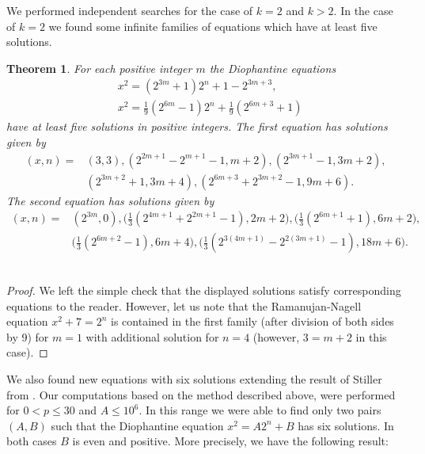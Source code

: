 \documentclass[10pt]{amsart}
\theoremstyle{plain}
\newtheorem{thm}{Theorem}[section]
\begin{document}
We performed independent searches for the case of $k=2$ and $k>2$.  In the case of $k=2$ we found some infinite families of equations which have at least five solutions.

\begin{thm}
For each positive integer $m$ the Diophantine equations
\begin{align*}
  &x^2=(2^{3m}+1)2^{n}+1-2^{3m+3}, \\
  &x^2=\frac{1}{9}(2^{6m}-1)2^{n}+\frac{1}{9}(2^{6m+3}+1)
\end{align*}
have at least five solutions in positive integers. The first equation has solutions given by
\begin{align*}
(x,n)=&(3,3), (2^{2m+1}-2^{m+1}-1,m+2), (2^{3m+1}-1, 3m+2), \\
      &(2^{3m+2}+1,3m+4), (2^{6m+3}+2^{3m+2}-1, 9m+6).
\end{align*}
The second equation has solutions given by
\begin{align*}
(x,n)=&(2^{3m},0), \Big(\frac{1}{3}(2^{4m+1}+2^{2m+1}-1), 2m+2\Big), \Big(\frac{1}{3}(2^{6m+1}+1), 6m+2\Big),\\
      &\Big(\frac{1}{3}(2^{6m+2}-1), 6m+4\Big), \Big(\frac{1}{3}(2^{3(4m+1)}-2^{2(3m+1)}-1), 18m+6\Big).
\end{align*}                   \\
\end{thm}
\begin{proof}
We left the simple check that the displayed solutions satisfy corresponding equations to the reader. However, let us note that the Ramanujan-Nagell equation $x^2+7=2^n$ is contained in the first family (after division of both sides by 9) for $m=1$ with additional solution for $n=4$ (however, $3=m+2$ in this case).
\end{proof}

We also found new equations with six solutions extending the result of Stiller from \cite{Sti}. Our computations based on the method described above, were performed for $0<p\leq 30$ and $A\leq 10^{6}$. In this range we were able to find only two pairs $(A, B)$ such that the Diophantine equation $x^2=A2^{n}+B$ has six solutions. In both cases $B$ is even and positive. More precisely, we have the following result:
\end{document}
